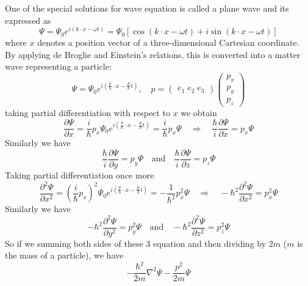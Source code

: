 \documentclass[11pt]{article}
\begin{document}
One of the special solutions for wave equation is called a plane wave and its expressed as
\begin{equation}
	\Psi = \Psi_0 e^{i(k \cdot x - \omega t)} = \Psi_0 [ \cos (k \cdot x - \omega t) + i \sin (k \cdot x - \omega t) ]
\end{equation}
where $x$ denotes a position vector of a three-dimensional Cartesian coordinate. By applying de Broglie and Einstein’s relations, this is converted into a matter wave representing a particle:
\begin{equation} \label{eq:8}
	\Psi = \Psi_0 e^{i(\frac{p}{h} \cdot x - \frac{E}{h} t)}, \quad 
	p = \begin{pmatrix} e_1 \; e_2 \; e_3 \end{pmatrix} \begin{pmatrix} p_x \\ p_y \\ p_z \end{pmatrix}
\end{equation}
taking partial differentiation with respect to $x$ we obtain
\begin{equation}
	\frac{\partial \Psi}{\partial x} = \frac{i}{\hbar} p_x \Psi_0 e^{i(\frac{p}{h} \cdot x - \frac{E}{h} t)} = \frac{i}{\hbar} p_x \Psi \quad \Rightarrow \quad
	\frac{\hbar}{i} \frac{\partial \Psi}{\partial x} = p_x \Psi
\end{equation}
Similarly we have
\begin{equation}
	\frac{\hbar}{i} \frac{\partial \Psi}{\partial y} = p_y \Psi \quad \text{and} \quad \frac{\hbar}{i} \frac{\partial \Psi}{\partial z} = p_z \Psi
\end{equation}
Taking partial differentiation once more 
\begin{equation}
	\frac{\partial^2 \Psi}{\partial x^2} = (\frac{i}{\hbar} p_x)^2 \Psi_0 e^{i(\frac{p}{h} \cdot x - \frac{E}{h} t)} = - \frac{1}{\hbar^2} p_x^2 \Psi \quad \Rightarrow \quad
	- \hbar^2 \frac{\partial^2 \Psi}{\partial x^2} = p_x^2 \Psi
\end{equation}
Similarly we have
\begin{equation}
	- \hbar^2 \frac{\partial^2 \Psi}{\partial y^2} = p_y^2 \Psi \quad \text{and} \quad - \hbar^2 \frac{\partial^2 \Psi}{\partial z^2} = p_z^2 \Psi
\end{equation}
So if we summing both sides of these 3 equation and then dividing by $2m$ ($m$ is the mass of a particle), we have
\begin{equation} \label{eq:13}
	- \frac{\hbar ^ 2}{2m} \nabla^2 \Psi - \frac{p^2}{2m} \Psi
\end{equation}
\end{document}

